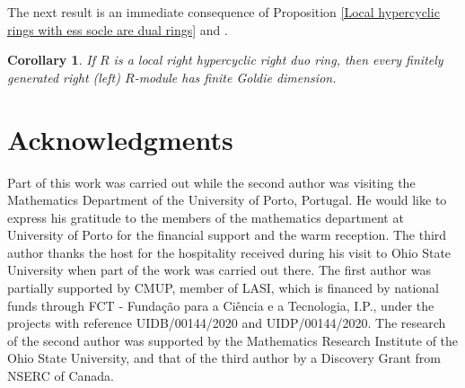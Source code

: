 \documentclass{amsart}
\theoremstyle{plain}
\newtheorem{corollary}[theorem]{Corollary}
\numberwithin{equation}{section}
\begin{document}
The next result is an immediate consequence of Proposition \ref{Local hypercyclic rings with ess socle are dual rings} and \cite[Theorem 5.3]{HN}.



\begin{corollary}
If $R$ is a local right hypercyclic right duo ring, then every finitely generated right (left) $R$-module has finite Goldie dimension. 
\end{corollary}

\section*{Acknowledgments}
Part of this work was carried out while the second author was visiting the Mathematics Department of the University of Porto, Portugal. He would like to express his gratitude to the members of the mathematics department at University of Porto for the financial support and the warm reception. The third author thanks the host for the hospitality received during his visit to Ohio State University when part of the work was carried out there. The first author was  partially supported by CMUP, member of LASI, which is financed by national funds through FCT - Fundação para a Ciência e a Tecnologia, I.P., under the projects with reference UIDB/00144/2020 and UIDP/00144/2020. The research of the second author was supported by the Mathematics Research Institute of the Ohio State University, and that of the third author by a Discovery Grant from NSERC of Canada.  
\end{document}
